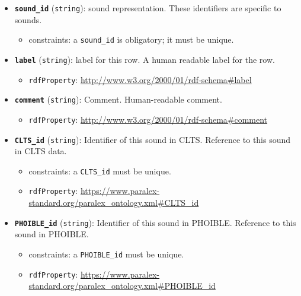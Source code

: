 \begin{itemize}
\item
  \textbf{\texttt{sound\_id}} (\texttt{string}): sound representation.
  These identifiers are specific to sounds.

  \begin{itemize}
  \tightlist
  \item
    constraints: a \texttt{sound\_id} is obligatory; it must be unique.
  \end{itemize}
\item
  \textbf{\texttt{label}} (\texttt{string}): label for this row. A human
  readable label for the row.

  \begin{itemize}
  \tightlist
  \item
    \texttt{rdfProperty}:
    \url{http://www.w3.org/2000/01/rdf-schema\#label}
  \end{itemize}
\item
  \textbf{\texttt{comment}} (\texttt{string}): Comment. Human-readable
  comment.

  \begin{itemize}
  \tightlist
  \item
    \texttt{rdfProperty}:
    \url{http://www.w3.org/2000/01/rdf-schema\#comment}
  \end{itemize}
\item
  \textbf{\texttt{CLTS\_id}} (\texttt{string}): Identifier of this sound
  in CLTS. Reference to this sound in CLTS data.

  \begin{itemize}
  \item
    constraints: a \texttt{CLTS\_id} must be unique.
  \item
    \texttt{rdfProperty}:
    \url{https://www.paralex-standard.org/paralex_ontology.xml\#CLTS_id}
  \end{itemize}
\item
  \textbf{\texttt{PHOIBLE\_id}} (\texttt{string}): Identifier of this
  sound in PHOIBLE. Reference to this sound in PHOIBLE.

  \begin{itemize}
  \item
    constraints: a \texttt{PHOIBLE\_id} must be unique.
  \item
    \texttt{rdfProperty}:
    \url{https://www.paralex-standard.org/paralex_ontology.xml\#PHOIBLE_id}
  \end{itemize}
\end{itemize}

